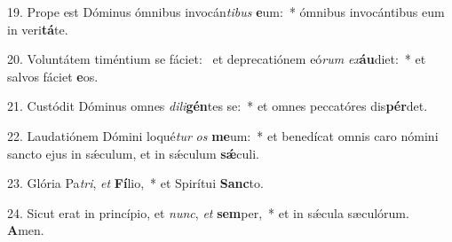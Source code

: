 19. Prope est Dóminus ómnibus invocán\textit{ti}\textit{bus} \textbf{e}um:~*  ómnibus invocántibus eum in veri\textbf{tá}te.\

20. Voluntátem timéntium se fáciet: \dag\  et deprecatiónem eó\textit{rum} \textit{ex}\textbf{áu}diet:~*  et salvos fáciet \textbf{e}os.\

21. Custódit Dóminus omnes \textit{di}\textit{li}\textbf{gén}tes se:~*  et omnes peccatóres dis\textbf{pér}det.\

22. Laudatiónem Dómini loqué\textit{tur} \textit{os} \textbf{me}um:~*  et benedícat omnis caro nómini sancto ejus in sǽculum, et in sǽculum \textbf{sǽ}culi.\

23. Glória Pa\textit{tri}, \textit{et} \textbf{Fí}lio,~*  et Spirítui \textbf{Sanc}to.\

24. Sicut erat in princípio, et \textit{nunc}, \textit{et} \textbf{sem}per,~*  et in sǽcula sæculórum. \textbf{A}men.\

